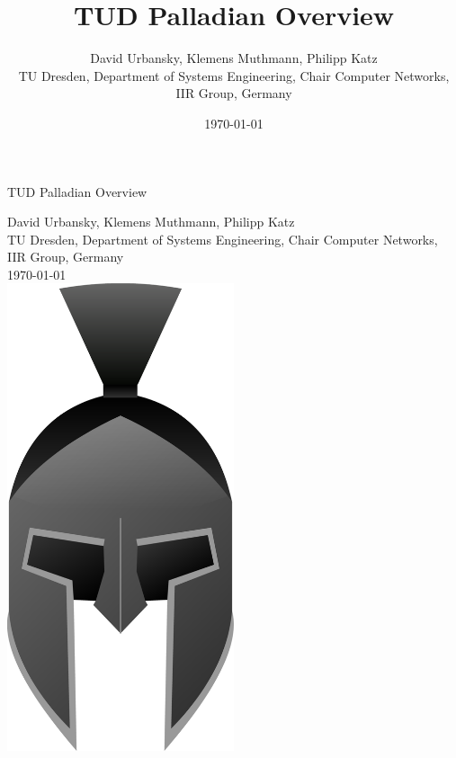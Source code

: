 \documentclass[a4paper,twoside]{book}      %
\date{\today}
\title{TUD Palladian Overview}
\author{David Urbansky, Klemens Muthmann, Philipp Katz \\
{\small TU Dresden, Department of Systems Engineering, Chair Computer Networks, IIR Group, Germany}
}
\newcommand{\bigsize}{\fontsize{18pt}{10pt}\selectfont}
\newcommand{\titleelementsize}{\fontsize{12pt}{10pt}\selectfont}
\begin{document}

\begin{titlepage}
\centering


{\bigsize TUD Palladian Overview} \\

\vspace{1.5cm}

{\titleelementsize David Urbansky, Klemens Muthmann, Philipp Katz} \\
\vspace{0.1cm}
{\small TU Dresden, Department of Systems Engineering, Chair Computer Networks, IIR Group, Germany} \\
\vspace{0.8cm}
{\titleelementsize \today} \\
\vspace{2cm}
\includegraphics[width=0.5\textwidth]{img/logo.png}

\end{titlepage}
\end{document}
